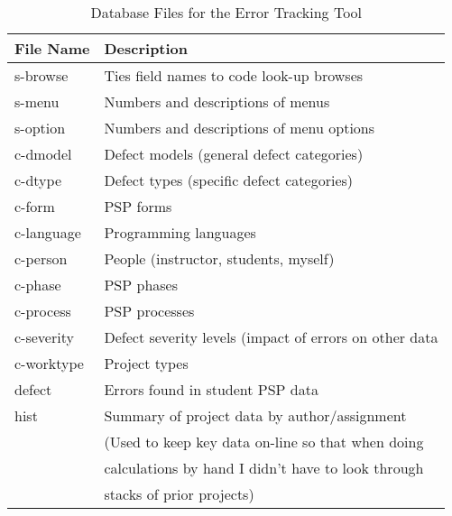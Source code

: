 \begin{table}[ht]
\begin{center}    
\caption{\label{table:errorTables}Database Files for the Error Tracking Tool}
\begin{tabular}{|l|l|} \hline 
File Name      & Description                                             \\ \hline\hline 

s-browse       & Ties field names to code look-up browses                \\ \hline
s-menu         & Numbers and descriptions of menus                       \\ \hline
s-option       & Numbers and descriptions of menu options                \\ \hline\hline
c-dmodel       & Defect models (general defect categories)               \\ \hline
c-dtype        & Defect types (specific defect categories)               \\ \hline
c-form         & PSP forms                                               \\ \hline
c-language     & Programming languages                                   \\ \hline
c-person       & People (instructor, students, myself)                   \\ \hline
c-phase        & PSP phases                                              \\ \hline
c-process      & PSP processes                                           \\ \hline
c-severity     & Defect severity levels (impact of errors on other data  \\ \hline
c-worktype     & Project types                                           \\ \hline\hline

defect         & Errors found in student PSP data                        \\ \hline
hist           & Summary of project data by author/assignment            \\
               & (Used to keep key data on-line so that when doing       \\
               & calculations by hand I didn't have to look through      \\
               & stacks of prior projects)                               \\ \hline 
        
\end{tabular}
\end{center} 
\end{table}


